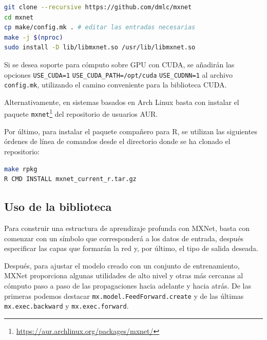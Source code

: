 \begin{lstlisting}[language=sh,frame=none]
git clone --recursive https://github.com/dmlc/mxnet
cd mxnet
cp make/config.mk . # editar las entradas necesarias
make -j $(nproc)
sudo install -D lib/libmxnet.so /usr/lib/libmxnet.so
\end{lstlisting}

Si se desea soporte para cómputo sobre GPU con CUDA, se añadirán las opciones \texttt{USE\_CUDA=1} \texttt{USE\_CUDA\_PATH=/opt/cuda} \texttt{USE\_CUDNN=1} al archivo \texttt{config.mk}, utilizando el camino conveniente para la biblioteca CUDA.

Alternativamente, en sistemas basados en Arch Linux basta con instalar el paquete \texttt{mxnet}\footnote{\url{https://aur.archlinux.org/packages/mxnet/}} del repositorio de usuarios AUR.

Por último, para instalar el paquete compañero para R, se utilizan las siguientes órdenes de línea de comandos desde el directorio donde se ha clonado el repositorio:

\begin{lstlisting}[language=sh,frame=none]
make rpkg
R CMD INSTALL mxnet_current_r.tar.gz
\end{lstlisting}

\subsection{Uso de la biblioteca}
Para construir una estructura de aprendizaje profunda con MXNet, basta con comenzar con un símbolo que corresponderá a los datos de entrada, después especificar las capas que formarán la red y, por último, el tipo de salida deseada.

Después, para ajustar el modelo creado con un conjunto de entrenamiento, MXNet proporciona algunas utilidades de alto nivel y otras más cercanas al cómputo paso a paso de las propagaciones hacia adelante y hacia atrás. De las primeras podemos destacar \texttt{mx.model.FeedForward.create} y de las últimas \texttt{mx.exec.backward} y \texttt{mx.exec.forward}.

